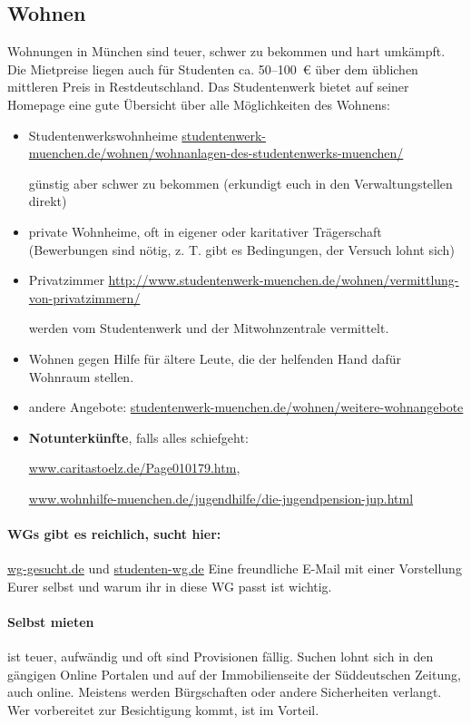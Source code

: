 \subsection{Wohnen}
Wohnungen in München sind teuer, schwer zu bekommen und hart umkämpft. Die Mietpreise liegen
auch für Studenten ca. 50--100~€ über dem üblichen mittleren Preis in
Restdeutschland. Das Studentenwerk bietet auf seiner Homepage eine
gute Übersicht über alle Möglichkeiten des Wohnens:

\begin{itemize}
\item Studentenwerkswohnheime \newline \url{studentenwerk-muenchen.de/wohnen/wohnanlagen-des-studentenwerks-muenchen/}

  günstig aber schwer zu bekommen (erkundigt euch in den Verwaltungstellen direkt)
\item private Wohnheime, oft in eigener oder karitativer Trägerschaft
  (Bewerbungen sind nötig, z. T. gibt es Bedingungen, der Versuch lohnt sich)
\item
  Privatzimmer \newline \url{http://www.studentenwerk-muenchen.de/wohnen/vermittlung-von-privatzimmern/}
  
werden vom Studentenwerk und der Mitwohnzentrale vermittelt.
\item Wohnen gegen Hilfe für ältere Leute, die der helfenden Hand dafür
  Wohnraum stellen.
\item andere Angebote: \url{studentenwerk-muenchen.de/wohnen/weitere-wohnangebote}
\item {\bf Notunterkünfte}, falls alles schiefgeht:

 \url{www.caritastoelz.de/Page010179.htm},

  \url{www.wohnhilfe-muenchen.de/jugendhilfe/die-jugendpension-jup.html}
\end{itemize}

\paragraph{WGs gibt es reichlich, sucht hier:}
\url{wg-gesucht.de} und \url{studenten-wg.de}\newline
Eine freundliche E-Mail mit einer Vorstellung Eurer selbst und warum ihr
in diese WG passt ist wichtig.

\paragraph{Selbst mieten} ist teuer, aufwändig und oft sind Provisionen
fällig. Suchen
lohnt sich in den gängigen Online Portalen und auf der Immobilienseite der
Süddeutschen Zeitung, auch online. Meistens werden Bürgschaften oder andere
Sicherheiten verlangt.  Wer vorbereitet zur Besichtigung kommt, ist im Vorteil.
